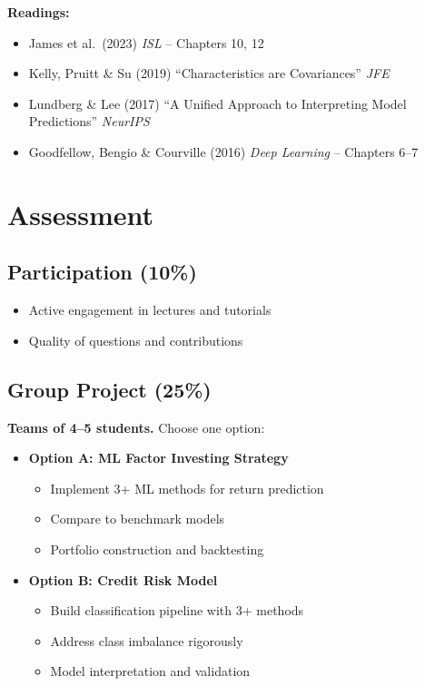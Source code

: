 \documentclass[11pt,a4paper]{article}
\newcommand{\recommended}[1]{\item[$\bullet$] #1}
\newcommand{\advanced}[1]{\item[$\circ$] #1}
\begin{document}
\textbf{Readings:}
\begin{itemize}[nosep]
    \recommended{James et al.\ (2023) \textit{ISL} -- Chapters 10, 12}
    \recommended{Kelly, Pruitt \& Su (2019) ``Characteristics are Covariances'' \textit{JFE}}
    \recommended{Lundberg \& Lee (2017) ``A Unified Approach to Interpreting Model Predictions'' \textit{NeurIPS}}
    \advanced{Goodfellow, Bengio \& Courville (2016) \textit{Deep Learning} -- Chapters 6--7}
\end{itemize}

\newpage 

\section{Assessment}

\subsection{Participation (10\%)}
\begin{itemize}[leftmargin=*]
    \item Active engagement in lectures and tutorials
    \item Quality of questions and contributions
\end{itemize}

\subsection{Group Project (25\%)}

\textbf{Teams of 4--5 students.} Choose one option:

\begin{itemize}[leftmargin=*]
    \item \textbf{Option A: ML Factor Investing Strategy}
    \begin{itemize}
        \item Implement 3+ ML methods for return prediction
        \item Compare to benchmark models
        \item Portfolio construction and backtesting
    \end{itemize}
    
    \item \textbf{Option B: Credit Risk Model}
    \begin{itemize}
        \item Build classification pipeline with 3+ methods
        \item Address class imbalance rigorously
        \item Model interpretation and validation
    \end{itemize}
\end{itemize}
\end{document}
